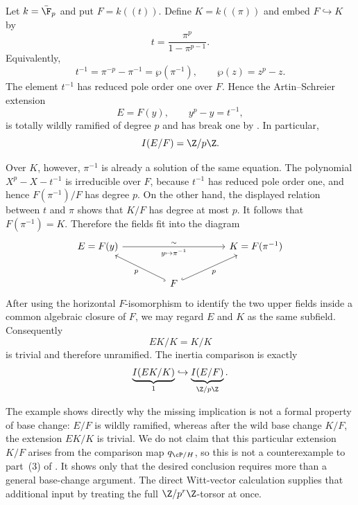 \begin{example}
\label{ex:p2-counterexample}
\label{ex:absorption-explicit}
Let $k=\bar{\F}_p$ and put $F=k((t))$. Define $K=k((\pi))$ and embed
$F\hookrightarrow K$ by
\[
t=\frac{\pi^p}{1-\pi^{p-1}}.
\]
Equivalently,
\[
t^{-1}=\pi^{-p}-\pi^{-1}
       =\wp(\pi^{-1}),
\qquad \wp(z)=z^p-z.
\]
The element $t^{-1}$ has reduced pole order one over $F$. Hence the
Artin--Schreier extension
\[
E=F(y),\qquad y^p-y=t^{-1},
\]
is totally wildly ramified of degree $p$ and has break one by
. In particular,
\[
I(E/F)=\Z/p\Z.
\]

Over $K$, however, $\pi^{-1}$ is already a solution of the same equation.
The polynomial $X^p-X-t^{-1}$ is irreducible over $F$, because $t^{-1}$
has reduced pole order one, and hence $F(\pi^{-1})/F$ has degree $p$.
On the other hand, the displayed relation between $t$ and $\pi$ shows that
$K/F$ has degree at most $p$. It follows that $F(\pi^{-1})=K$. Therefore
the fields fit into the diagram
\[
\begin{tikzcd}[row sep=2.2em, column sep=4.5em]
E=F(y)\ar[rr,"\sim","{y\mapsto\pi^{-1}}"']
  &&K=F(\pi^{-1})\\
  &F\ar[ul,hookrightarrow,"p"]\ar[ur,hookrightarrow,"p"']&
\end{tikzcd}
\]
After using the horizontal $F$-isomorphism to identify the two upper fields
inside a common algebraic closure of $F$, we may regard $E$ and $K$ as the
same subfield. Consequently
\[
EK/K=K/K
\]
is trivial and therefore unramified. The inertia comparison is exactly
\[
\underbrace{I(EK/K)}_{1}
\hookrightarrow
\underbrace{I(E/F)}_{\Z/p\Z}.
\]
\end{example}

The example shows directly why the missing implication is not a formal
property of base change: $E/F$ is wildly ramified, whereas after the wild
base change $K/F$, the extension $EK/K$ is trivial. We do not claim that
this particular extension $K/F$ arises from the comparison map
$q_{\cP/H}$, so this is not a counterexample to part~(3) of
. It shows only that the desired
conclusion requires more than a general base-change argument. The direct
Witt-vector calculation supplies that additional input by treating the full
$\Z/p^r\Z$-torsor at once.
